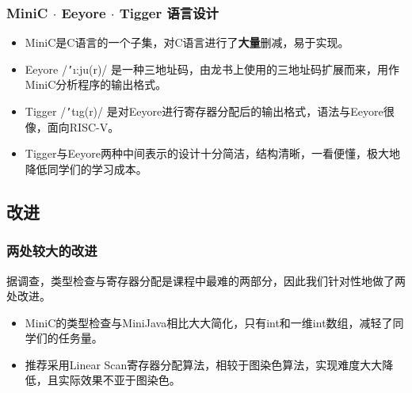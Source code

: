 \documentclass{beamer}
\begin{document}
\begin{frame}
    \frametitle{MiniC $\cdot$ Eeyore $\cdot$ Tigger 语言设计}
    \begin{itemize}
        \setlength{\itemsep}{.5cm}
        \item MiniC是C语言的一个子集，对C语言进行了\textbf{大量}删减，易于实现。

        \item Eeyore /\texttt{'}\i:ju\textschwa(r)/ 是一种三地址码，由龙书上使用的三地址码扩展而来，用作MiniC分析程序的输出格式。

        \item Tigger /\texttt{'}t\i g\textschwa(r)/ 是对Eeyore进行寄存器分配后的输出格式，语法与Eeyore很像，面向RISC-V。
    
        \item Tigger与Eeyore两种中间表示的设计十分简洁，结构清晰，一看便懂，极大地降低同学们的学习成本。
    \end{itemize}
\end{frame}


\subsection{改进}

\begin{frame}
    \frametitle{两处较大的改进}
    据调查，类型检查与寄存器分配是课程中最难的两部分，因此我们针对性地做了两处改进。
    \begin{itemize}
        \item MiniC的类型检查与MiniJava相比大大简化，只有int和一维int数组，减轻了同学们的任务量。
        \item 推荐采用Linear Scan寄存器分配算法，相较于图染色算法，实现难度大大降低，且实际效果不亚于图染色。
    \end{itemize}
\end{frame}
\end{document}
